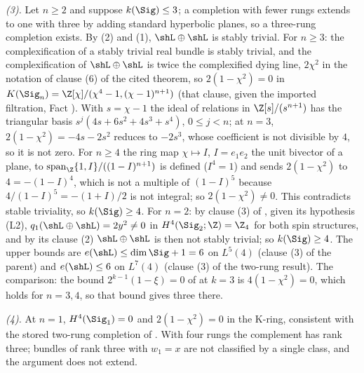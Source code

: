\emph{(3).} Let $n \geq 2$ and suppose $k(\Sig) \leq 3$; a completion with fewer rungs extends to one with three by adding standard hyperbolic planes, so a three-rung completion exists. By (2) and (1), $\shL \oplus \shL$ is stably trivial. For $n \geq 3$: the complexification of a stably trivial real bundle is stably trivial, and the complexification of $\shL \oplus \shL$ is twice the complexified dying line, $2\chi^{2}$ in the notation of clause (6) of the cited theorem, so $2(1 - \chi^{2}) = 0$ in $K(\Sig_{n}) = \Z[\chi]/(\chi^{4} - 1, (\chi - 1)^{n+1})$ (that clause, given the imported filtration, Fact ). With $s = \chi - 1$ the ideal of relations in $\Z[s]/(s^{n+1})$ has the triangular basis $s^{j}(4s + 6s^{2} + 4s^{3} + s^{4})$, $0 \leq j < n$; at $n = 3$, $2(1 - \chi^{2}) = -4s - 2s^{2}$ reduces to $-2s^{3}$, whose coefficient is not divisible by $4$, so it is not zero. For $n \geq 4$ the ring map $\chi \mapsto I$, $I = e_{1}e_{2}$ the unit bivector of a plane, to $\mathrm{span}_{\Z}\{1, I\}/((1 - I)^{n+1})$ is defined ($I^{4} = 1$) and sends $2(1 - \chi^{2})$ to $4 = -(1 - I)^{4}$, which is not a multiple of $(1 - I)^{5}$ because $4/(1 - I)^{5} = -(1 + I)/2$ is not integral; so $2(1 - \chi^{2}) \neq 0$. This contradicts stable triviality, so $k(\Sig) \geq 4$. For $n = 2$: by clause (3) of , given its hypothesis (L2), $q_{1}(\shL \oplus \shL) = 2y^{2} \neq 0$ in $H^{4}(\Sig_{2}; \Z) = \Z_{4}$ for both spin structures, and by its clause (2) $\shL \oplus \shL$ is then not stably trivial; so $k(\Sig) \geq 4$. The upper bounds are $e(\shL) \leq \dim\Sig + 1 = 6$ on $L^{5}(4)$ (clause (3) of the parent) and $e(\shL) \leq 6$ on $L^{7}(4)$ (clause (3) of the two-rung result). The comparison: the bound $2^{k-1}(1 - \xi) = 0$ of  at $k = 3$ is $4(1 - \chi^{2}) = 0$, which holds for $n = 3, 4$, so that bound gives three there.

\emph{(4).} At $n = 1$, $H^{4}(\Sig_{1}) = 0$ and $2(1 - \chi^{2}) = 0$ in the K-ring, consistent with the stored two-rung completion of . With four rungs the complement has rank three; bundles of rank three with $w_{1} = x$ are not classified by a single class, and the argument does not extend.
